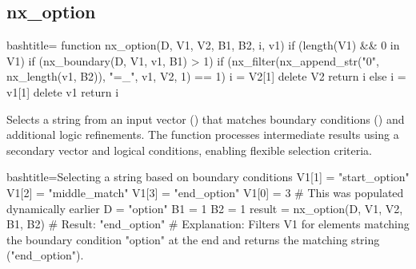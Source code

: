 \newpage
\subsection{nx_option}
\label{nx_option}
\begin{NexCodeBox}{bash}{title={}}
function nx_option(D, V1, V2, B1, B2,   i, v1)
{
	if (length(V1) && 0 in V1) {
		if (nx_boundary(D, V1, v1, B1) > 1) {
			if (nx_filter(nx_append_str("0", nx_length(v1, B2)), "=_", v1, V2, 1) == 1) {
				i = V2[1]
				delete V2
				return i
			}
		} else {
			i = v1[1]
			delete v1
			return i
		}
	}
}
\end{NexCodeBox}

\begin{NexMainBox}
	\begin{NexMainBox}
		Selects a string from an input vector () that matches boundary conditions () and additional logic refinements. The function processes intermediate results using a secondary vector and logical conditions, enabling flexible selection criteria.
	\end{NexMainBox}
	\begin{NexMainBox}
		\begin{NexListDark}
		\end{NexListDark}
	\end{NexMainBox}
\end{NexMainBox}

\begin{NexCodeBox}{bash}{title={Selecting a string based on boundary conditions}}
	V1[1] = "start_option"
	V1[2] = "middle_match"
	V1[3] = "end_option"
	V1[0] = 3 # This was populated dynamically earlier
	D = "option"
	B1 = 1
	B2 = 1
	result = nx_option(D, V1, V2, B1, B2)
	# Result: "end_option"
	# Explanation: Filters V1 for elements matching the boundary condition "option" at the end and returns the matching string ("end_option").
\end{NexCodeBox}

